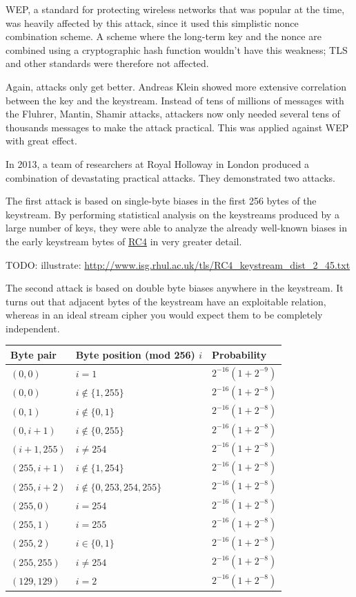 \documentclass[11pt,ebook,table,dvipsnames]{memoir}
\begin{document}
WEP, a standard for protecting wireless networks that was popular at
the time, was heavily affected by this attack, since it used this
simplistic nonce combination scheme. A scheme where the long-term key
and the nonce are combined using a cryptographic hash function
wouldn't have this weakness; TLS and other standards were therefore
not affected.

Again, attacks only get better. Andreas Klein showed more extensive
correlation between the key and the keystream. \cite{klein:rc4}
Instead of tens of millions of messages with the Fluhrer, Mantin,
Shamir attacks, attackers now only needed several tens of thousands
messages to make the attack practical. This was applied against WEP
with great effect.

In 2013, a team of researchers at Royal Holloway in London produced a
combination of devastating practical attacks. \cite{rhul:rc4} They
demonstrated two attacks.

The first attack is based on single-byte biases in the first 256 bytes
of the keystream. By performing statistical analysis on the keystreams
produced by a large number of keys, they were able to analyze the
already well-known biases in the early keystream bytes of \hyperref[RC4]{RC4} in very
greater detail.

TODO: illustrate: \url{http://www.isg.rhul.ac.uk/tls/RC4_keystream_dist_2_45.txt}

The second attack is based on double byte biases anywhere in the
keystream. It turns out that adjacent bytes of the keystream have an
exploitable relation, whereas in an ideal stream cipher you would
expect them to be completely independent.

\begin{center}
\begin{tabular}{lll}
Byte pair & Byte position (mod 256) $i$ & Probability\\
\hline
$(0, 0)$ & $i = 1$ & $2^{-16} (1 + 2^{-9})$\\
$(0, 0)$ & $i \not \in \{{1, 255}\}$ & $2^{-16} (1 + 2^{-8})$\\
$(0, 1)$ & $i \not \in \{{0, 1}\}$ & $2^{-16} (1 + 2^{-8})$\\
$(0, i + 1)$ & $i \not \in \{{0, 255}\}$ & $2^{-16} (1 + 2^{-8})$\\
$(i + 1, 255)$ & $i \ne 254$ & $2^{-16} (1 + 2^{-8})$\\
$(255, i + 1)$ & $i \not \in \{{1, 254}\}$ & $2^{-16} (1 + 2^{-8})$\\
$(255, i + 2)$ & $i \not \in \{{0, 253, 254, 255}\}$ & $2^{-16} (1 + 2^{-8})$\\
$(255, 0)$ & $i = 254$ & $2^{-16} (1 + 2^{-8})$\\
$(255, 1)$ & $i = 255$ & $2^{-16} (1 + 2^{-8})$\\
$(255, 2)$ & $i \in \{{0, 1}\}$ & $2^{-16} (1 + 2^{-8})$\\
$(255, 255)$ & $i \ne 254$ & $2^{-16} (1 + 2^{-8})$\\
$(129, 129)$ & $i = 2$ & $2^{-16} (1 + 2^{-8})$\\
\end{tabular}
\end{center}
\end{document}
